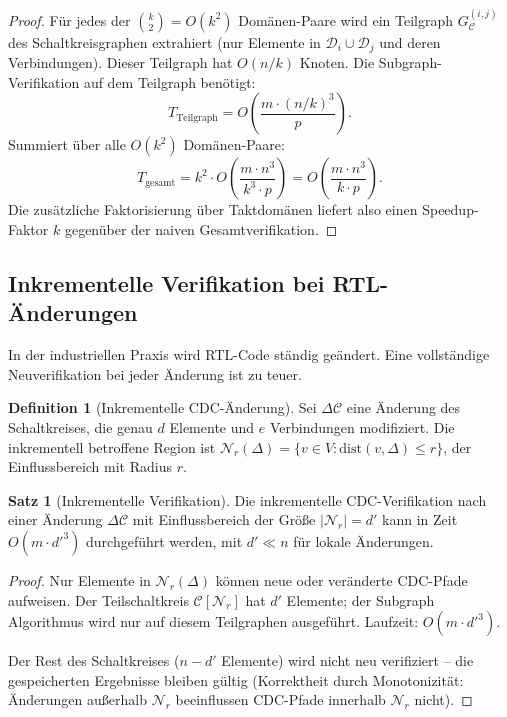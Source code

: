 ﻿\documentclass[a4paper,12pt]{article}
\theoremstyle{definition}
\newtheorem{definition}{Definition}
\newtheorem{satz}{Satz}
\begin{document}
	\begin{proof}
		F\"ur jedes der $\binom{k}{2} = O(k^2)$ Dom\"anen-Paare wird ein
		Teilgraph $G_{\mathcal{C}}^{(i,j)}$ des Schaltkreisgraphen extrahiert
		(nur Elemente in $\mathcal{D}_i \cup \mathcal{D}_j$ und deren Verbindungen).
		Dieser Teilgraph hat $O(n/k)$ Knoten.
		Die Subgraph-Verifikation auf dem Teilgraph ben\"otigt:
		\[
		T_{\mathrm{Teilgraph}} = O\!\left(\frac{m \cdot (n/k)^3}{p}\right).
		\]
		Summiert \"uber alle $O(k^2)$ Dom\"anen-Paare:
		\[
		T_{\mathrm{gesamt}} = k^2 \cdot O\!\left(\frac{m \cdot n^3}{k^3 \cdot p}\right)
		= O\!\left(\frac{m \cdot n^3}{k \cdot p}\right).
		\]
		Die zus\"atzliche Faktorisierung \"uber Taktdom\"anen liefert also einen
		Speedup-Faktor $k$ gegen\"uber der naiven Gesamtverifikation. \qedhere
	\end{proof}
	
	\subsection{Inkrementelle Verifikation bei RTL-\"Anderungen}
	
	In der industriellen Praxis wird RTL-Code st\"andig ge\"andert.
	Eine vollst\"andige Neuverifikation bei jeder \"Anderung ist zu teuer.
	
	\begin{definition}[Inkrementelle CDC-\"Anderung]
		Sei $\Delta \mathcal{C}$ eine \"Anderung des Schaltkreises, die genau
		$d$ Elemente und $e$ Verbindungen modifiziert. Die inkrementell
		betroffene Region ist $\mathcal{N}_r(\Delta) = \{v \in V : \mathrm{dist}(v, \Delta) \leq r\}$,
		der Einflussbereich mit Radius $r$.
	\end{definition}
	
	\begin{satz}[Inkrementelle Verifikation]
		\label{satz:inkrementell}
		Die inkrementelle CDC-Verifikation nach einer \"Anderung $\Delta \mathcal{C}$
		mit Einflussbereich der Gr\"o\ss{}e $|\mathcal{N}_r| = d'$ kann in Zeit
		$O(m \cdot d'^3)$ durchgef\"uhrt werden, mit $d' \ll n$ f\"ur lokale
		\"Anderungen.
	\end{satz}
	
	\begin{proof}
		Nur Elemente in $\mathcal{N}_r(\Delta)$ k\"onnen neue oder ver\"anderte
		CDC-Pfade aufweisen. Der Teilschaltkreis $\mathcal{C}[\mathcal{N}_r]$
		hat $d'$ Elemente; der Subgraph Algorithmus wird nur auf diesem
		Teilgraphen ausgef\"uhrt. Laufzeit: $O(m \cdot d'^3)$.
		
		Der Rest des Schaltkreises ($n - d'$ Elemente) wird nicht neu verifiziert --
		die gespeicherten Ergebnisse bleiben g\"ultig (Korrektheit durch
		Monotonizit\"at: \"Anderungen au\ss{}erhalb $\mathcal{N}_r$ beeinflussen
		CDC-Pfade innerhalb $\mathcal{N}_r$ nicht). \qedhere
	\end{proof}
	
\end{document}
